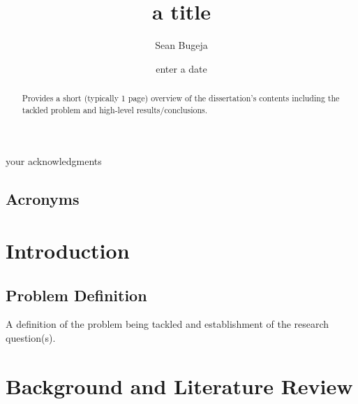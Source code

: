 \documentclass[12pt, a4paper]{report}
\theoremstyle{definition}
\theoremstyle{definition}%
\theoremstyle{definition}%
\theoremstyle{definition}%
\theoremstyle{definition}%
\theoremstyle{definition}%
\begin{document}
\title{a title}
\author{Sean Bugeja}
\date{enter a date}

\frontmatter


\begin{acknowledgements}
your acknowledgments
\end{acknowledgements}
       
\begin{abstract}
Provides a short (typically 1 page) overview of the dissertation’s contents including the tackled problem and high-level results/conclusions.
\end{abstract}

\tableofcontents

\listoffigures

\listoftables

\newpage
\section*{Acronyms}
\begin{acronym}
\end{acronym}


\mainmatter

\chapter{Introduction}

\section{Problem Definition}
A definition of the problem being tackled and establishment of the research question(s).


\chapter{Background and Literature Review}
\end{document}
